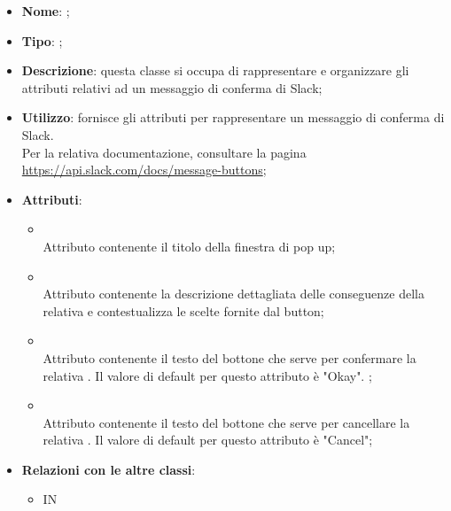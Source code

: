 \begin{itemize}
	\item \textbf{Nome}: ;
	\item \textbf{Tipo}: ;
	\item \textbf{Descrizione}: questa classe si occupa di rappresentare e organizzare gli attributi relativi ad un messaggio di conferma di Slack;
	\item \textbf{Utilizzo}: fornisce gli attributi per rappresentare un messaggio di conferma di Slack.
\\
Per la relativa documentazione, consultare la pagina \url{https://api.slack.com/docs/message-buttons};
	\item \textbf{Attributi}:
	\begin{itemize}
		\item[]  \\
		Attributo contenente il titolo della finestra di pop up;
		\item[]  \\
		Attributo contenente la descrizione dettagliata delle conseguenze della relativa  e contestualizza le scelte fornite dal button;
		\item[]  \\
		Attributo contenente il testo del bottone che serve per confermare la relativa . Il valore di default per questo attributo è "Okay".
;
		\item[]  \\
		Attributo contenente il testo del bottone che serve per cancellare la relativa . Il valore di default per questo attributo è "Cancel";
	\end{itemize}
	\item \textbf{Relazioni con le altre classi}:
	\begin{itemize}
		\item IN \hyperlink{Action_label}{}
	\end{itemize}
\end{itemize}
\FloatBarrier

